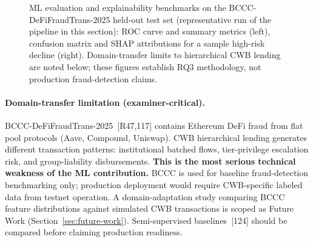 \documentclass[12pt,a4paper]{report}
\begin{document}
\begin{figure}[H]
\begin{minipage}[t]{0.48\linewidth}
\vspace{4pt}
\end{minipage}
\caption[ML evaluation and explainability benchmarks]{ML evaluation and explainability benchmarks on the BCCC-DeFiFraudTrans-2025 held-out test set (representative run of the pipeline in this section): ROC curve and summary metrics (left), confusion matrix and SHAP attributions for a sample high-risk decline (right). Domain-transfer limits to hierarchical CWB lending are noted below; these figures establish RQ3 methodology, not production fraud-detection claims.}
\label{fig:ml-eval}
\end{figure}

\paragraph{Domain-transfer limitation (examiner-critical).}
BCCC-DeFiFraudTrans-2025~[R47,117] contains Ethereum DeFi fraud from flat pool protocols (Aave, Compound, Uniswap). CWB hierarchical lending generates different transaction patterns: institutional batched flows, tier-privilege escalation risk, and group-liability disbursements. \textbf{This is the most serious technical weakness of the ML contribution.} BCCC is used for baseline fraud-detection benchmarking only; production deployment would require CWB-specific labeled data from testnet operation. A domain-adaptation study comparing BCCC feature distributions against simulated CWB transactions is scoped as Future Work (Section~\ref{sec:future-work}). Semi-supervised baselines~[124] should be compared before claiming production readiness.
\end{document}
